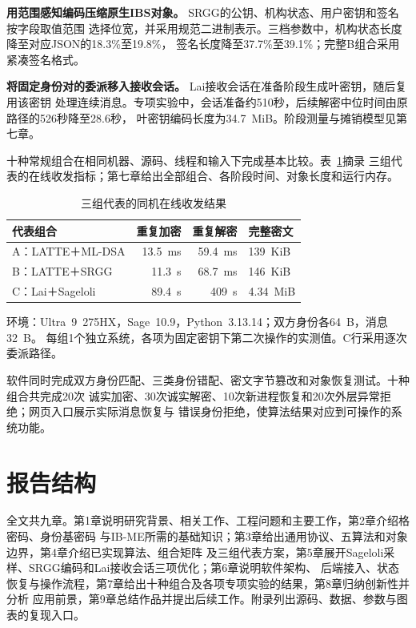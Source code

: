 \textbf{用范围感知编码压缩原生IBS对象。} SRGG的公钥、机构状态、用户密钥和签名按字段取值范围
选择位宽，并采用规范二进制表示。三档参数中，机构状态长度降至对应JSON的18.3\%至19.8\%，
签名长度降至37.7\%至39.1\%；完整B组合采用紧凑签名格式。

\textbf{将固定身份对的委派移入接收会话。} Lai接收会话在准备阶段生成叶密钥，随后复用该密钥
处理连续消息。专项实验中，会话准备约510秒，后续解密中位时间由原路径的526秒降至28.6秒，
叶密钥编码长度为34.7~MiB。阶段测量与摊销模型见第七章。

十种常规组合在相同机器、源码、线程和输入下完成基本比较。表~\ref{tab:work-highlights}摘录
三组代表的在线收发指标；第七章给出全部组合、各阶段时间、对象长度和运行内存。

\begin{table}[H]
\centering\small
\caption{三组代表的同机在线收发结果}
\label{tab:work-highlights}
\begin{tabularx}{\textwidth}{@{}p{}rrX@{}}
\toprule
\rowcolor{black!8} 代表组合 & 重复加密 & 重复解密 & 完整密文 \\
\midrule
A：LATTE＋ML-DSA & 13.5~ms & 59.4~ms & 139~KiB \\
B：LATTE＋SRGG & 11.3~s & 68.7~ms & 146~KiB \\
C：Lai＋Sageloli & 89.4~s & 409~s & 4.34~MiB \\
\bottomrule
\end{tabularx}
\begin{minipage}{.98\textwidth}\footnotesize
环境：Ultra~9~275HX，Sage~10.9，Python~3.13.14；双方身份各64~B，消息32~B。
每组1个独立系统，各项为固定密钥下第二次操作的实测值。C行采用逐次委派路径。
\end{minipage}
\end{table}

软件同时完成双方身份匹配、三类身份错配、密文字节篡改和对象恢复测试。十种组合共完成20次
诚实加密、30次诚实解密、10次新进程恢复和20次外层异常拒绝；网页入口展示实际消息恢复与
错误身份拒绝，使算法结果对应到可操作的系统功能。

\section{报告结构}

全文共九章。第1章说明研究背景、相关工作、工程问题和主要工作，第2章介绍格密码、身份基密码
与IB-ME所需的基础知识；第3章给出通用协议、五算法和对象边界，第4章介绍已实现算法、组合矩阵
及三组代表方案，第5章展开Sageloli采样、SRGG编码和Lai接收会话三项优化；第6章说明软件架构、
后端接入、状态恢复与操作流程，第7章给出十种组合及各项专项实验的结果，第8章归纳创新性并分析
应用前景，第9章总结作品并提出后续工作。附录列出源码、数据、参数与图表的复现入口。
